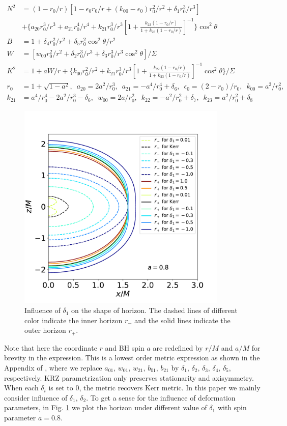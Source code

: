 \documentclass{article}
\begin{document}
\begin{equation}
\begin{aligned}
N^2&=(1-r_0/r)[ 1-\epsilon_0r_0/r +(k_{00}-\epsilon_0)r_0^2/r^2 +\delta_1 r_0^3/r^3 ] \\
&+ \{ a_{20} r_0^3/r^3 +a_{21} r_0^4/r^4 + k_{21}r_0^3/r^3[ 1+\frac{k_{22}(1-r_0/r) }{1+k_{23}(1-r_0/r)} ]^{-1}   \} \cos^2\theta   \\
B&=1+\delta_4r_0^2 /r^2 +\delta_5r_0^2 \cos^2\theta /r^2\\
W&=[w_{00}r_0^2 /r^2 +\delta_2 r_0^3/r^3 +\delta_3 r_0^3/r^3 \cos^2\theta ]/\Sigma\\
K^2&= 1+aW/r+\{k_{00}r_0^2/r^2 +k_{21}r_0^3/r^3 [ 1+\frac{k_{22}(1-r_0/r) }{1+k_{23}(1-r_0/r)} ]^{-1} \cos^2\theta \}/\Sigma\\
r_0&=1+\sqrt{1-a^2},\,\,\, a_{20}=2a^2/r_0^3,\,\,\, a_{21}=-a^4/r_0^4 +\delta_6 ,\,\,\, \epsilon_0=(2-r_0)/r_0,\,\,\, k_{00}=a^2/r_0^2,\\
 k_{21}&=a^4/r_0^4 -2a^2/r_0^3-\delta_6,\,\,\, w_{00}=2a/r_0^2,\,\,\, k_{22}=-a^2/r_0^2 +\delta_7,\,\,\,  k_{23} = a^2/r_0^2 +\delta_8
\end{aligned}
\end{equation}
\begin{figure}[!ht]
	\centering
	\includegraphics[width=10cm]{horizon.pdf}
	
	\caption{Influence of $\delta_1$ on the shape of horizon. The dashed lines of different color indicate the inner horizon $r_-$ and the solid lines indicate the outer horizon $r_+$. }
	\label{hori}
\end{figure}	
Note that here the coordinate $r$ and BH spin $a$ are redefined by $r/M$ and $a/M$ for brevity in the expression. This is a lowest order metric expression as shown in the Appendix of \cite{KRZ}, where we replace $a_{01},\,w_{01},\, w_{21},\, b_{01},\, b_{21}$ by $\delta_1,\, \delta_2,\, \delta_3,\, \delta_4,\, \delta_5$, respectively. KRZ parametrization only preserves stationarity and axisymmetry. When each $\delta_i$ is set to 0, the metric recovers Kerr metric. In this paper we mainly consider influence of $\delta_1, \, \delta_2$. To get a sense for the influence of deformation parameters, in Fig. \ref{hori} we plot the horizon under different value of $\delta_1$ with spin parameter $a=0.8$.
\end{document}

